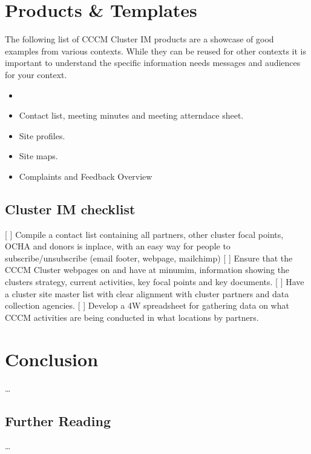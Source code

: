 \documentclass[letterpaper,10pt,english]{jupyterBook}
\begin{document}
\chapter{Products \& Templates}
\label{\detokenize{part3/products:products-templates}}\label{\detokenize{part3/products::doc}}
\sphinxAtStartPar
The following list of CCCM Cluster IM products are a showcase of good examples from various contexts. While they can be reused for other contexts it is important to understand the specific information needs messages and audiences for your context.
\begin{itemize}
\item {} 
\sphinxAtStartPar
{}

\item {} 
\sphinxAtStartPar
Contact list, meeting minutes and meeting atterndace sheet.

\item {} 
\sphinxAtStartPar
Site profiles.

\item {} 
\sphinxAtStartPar
Site maps.

\item {} 
\sphinxAtStartPar
Complaints and Feedback Overview

\end{itemize}


\section{Cluster IM checklist}
\label{\detokenize{part3/products:cluster-im-checklist}}
\sphinxAtStartPar
{[} {]} Compile a contact list containing all partners, other cluster focal points, OCHA and donors is in\sphinxhyphen{}place, with an easy way for people to subscribe/unsubscribe (email footer, webpage, mailchimp)
{[} {]} Ensure that the CCCM Cluster webpages on  and  have at minumim, information showing the clusters strategy, current activities, key focal points and key documents.
{[} {]} Have a cluster site master list with clear alignment with cluster partners and data collection agencies.
{[} {]} Develop a 4W spreadsheet for gathering data on what CCCM activities are being conducted in what locations by partners.


\chapter{Conclusion}
\label{\detokenize{conclusion:conclusion}}\label{\detokenize{conclusion::doc}}
\sphinxAtStartPar
…


\section{Further Reading}
\label{\detokenize{conclusion:further-reading}}
\sphinxAtStartPar
…







\renewcommand{\indexname}{Index}
\printindex
\end{document}
